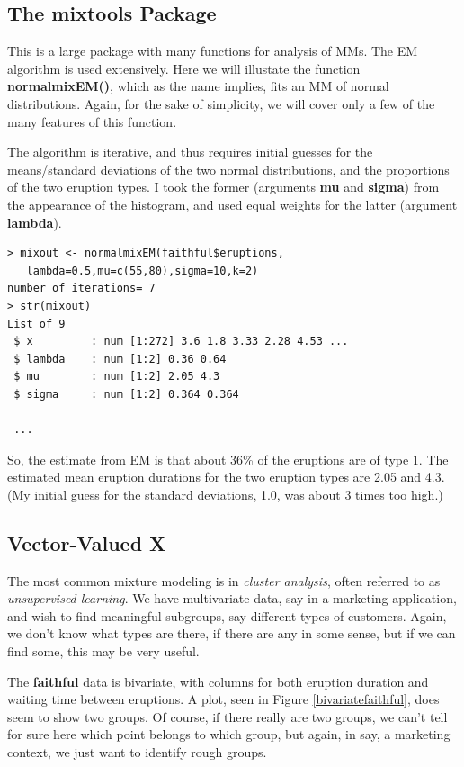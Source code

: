 \documentclass[11pt]{article}
\begin{document}
\subsection{The mixtools Package}

This is a large package with many functions for analysis of MMs.  The EM
algorithm is used extensively.  Here we will illustate the function
\textbf{normalmixEM()}, which as the name implies, fits an MM of normal
distributions.  Again, for the sake of simplicity, we will cover only a
few of the many features of this function.

The algorithm is iterative, and thus requires initial guesses for the
means/standard deviations of the two normal distributions, and the
proportions of the two eruption types.  I took the former (arguments
\textbf{mu} and \textbf{sigma}) from the appearance of the histogram,
and used equal weights for the latter (argument \textbf{lambda}).

\begin{lstlisting}
> mixout <- normalmixEM(faithful$eruptions,
   lambda=0.5,mu=c(55,80),sigma=10,k=2) 
number of iterations= 7
> str(mixout)
List of 9
 $ x         : num [1:272] 3.6 1.8 3.33 2.28 4.53 ...
 $ lambda    : num [1:2] 0.36 0.64
 $ mu        : num [1:2] 2.05 4.3
 $ sigma     : num [1:2] 0.364 0.364

 ...
\end{lstlisting}

So, the estimate from EM is that about 36\% of the eruptions are of type
1.  The estimated mean eruption durations for the two eruption types
are 2.05 and 4.3.  (My initial guess for the standard deviations, 1.0,
was about 3 times too high.)

\subsection{Vector-Valued X}

The most common mixture modeling is in \textit{cluster analysis}, often
referred to as \textit{unsupervised learning}.  We have multivariate
data, say in a marketing application, and wish to find meaningful
subgroups, say different types of customers.  Again, we don't know what
types are there, if there are any in some sense, but if we can find
some, this may be very useful.

The \textbf{faithful} data is bivariate, with columns for both eruption
duration and waiting time between eruptions.  A plot, seen in Figure
\ref{bivariatefaithful}, does seem to show two groups.  Of course, if
there really are two groups, we can't tell for sure here which point
belongs to which group, but again, in say, a marketing context, we just
want to identify rough groups.  
\end{document}
